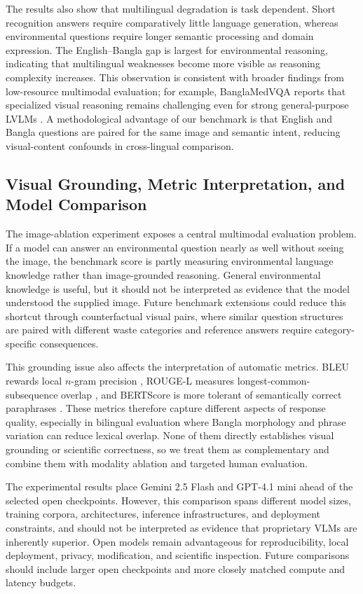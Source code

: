 \documentclass{article}
\begin{document}
The results also show that multilingual degradation is task dependent. Short recognition answers require comparatively little language generation, whereas environmental questions require longer semantic processing and domain expression. The English--Bangla gap is largest for environmental reasoning, indicating that multilingual weaknesses become more visible as reasoning complexity increases. This observation is consistent with broader findings from low-resource multimodal evaluation; for example, BanglaMedVQA reports that specialized visual reasoning remains challenging even for strong general-purpose LVLMs \citep{ahmed2026banglamedvqa}. A methodological advantage of our benchmark is that English and Bangla questions are paired for the same image and semantic intent, reducing visual-content confounds in cross-lingual comparison.

\subsection{Visual Grounding, Metric Interpretation, and Model Comparison}
\label{subsec:grounding_metric_models}

The image-ablation experiment exposes a central multimodal evaluation problem. If a model can answer an environmental question nearly as well without seeing the image, the benchmark score is partly measuring environmental language knowledge rather than image-grounded reasoning. General environmental knowledge is useful, but it should not be interpreted as evidence that the model understood the supplied image. Future benchmark extensions could reduce this shortcut through counterfactual visual pairs, where similar question structures are paired with different waste categories and reference answers require category-specific consequences.

This grounding issue also affects the interpretation of automatic metrics. BLEU rewards local $n$-gram precision \citep{papineni2002bleu}, ROUGE-L measures longest-common-subsequence overlap \citep{lin2004rouge}, and BERTScore is more tolerant of semantically correct paraphrases \citep{zhang2020bertscore}. These metrics therefore capture different aspects of response quality, especially in bilingual evaluation where Bangla morphology and phrase variation can reduce lexical overlap. None of them directly establishes visual grounding or scientific correctness, so we treat them as complementary and combine them with modality ablation and targeted human evaluation.

The experimental results place Gemini 2.5 Flash and GPT-4.1 mini ahead of the selected open checkpoints. However, this comparison spans different model sizes, training corpora, architectures, inference infrastructures, and deployment constraints, and should not be interpreted as evidence that proprietary VLMs are inherently superior. Open models remain advantageous for reproducibility, local deployment, privacy, modification, and scientific inspection. Future comparisons should include larger open checkpoints and more closely matched compute and latency budgets.
\end{document}
